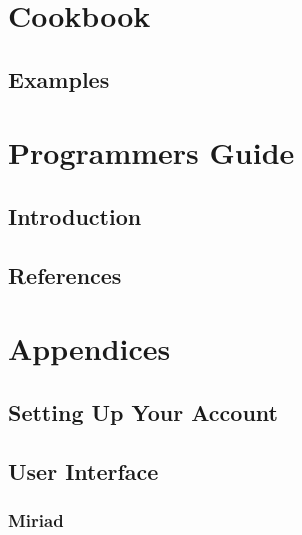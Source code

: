 \part{Cookbook}
\cleardoublepage
\chapter                {Examples}
 
\part{Programmers Guide}
\chapter                {Introduction}
 
\cleardoublepage
\chapter                {References}
 
\appendix
\cleardoublepage
\part{Appendices}
\chapter                {Setting Up Your Account}
 
\cleardoublepage
\chapter                {User Interface}
 
\section		{Miriad}
 
% 
\cleardoublepage

